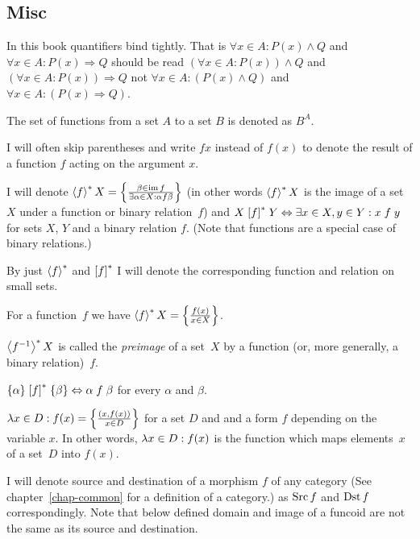 \subsection{Misc}

In this book quantifiers bind tightly. That is $\forall x\in A:P(x)\land Q$
and $\forall x\in A:P(x)\Rightarrow Q$ should be read $\left(\forall x\in A:P(x)\right)\land Q$
and $\left(\forall x\in A:P(x)\right)\Rightarrow Q$ not $\forall x\in A:\left(P(x)\land Q\right)$
and $\forall x\in A:\left(P(x)\Rightarrow Q\right)$.

The set of functions from a set $A$ to a set $B$ is denoted as $B^{A}$.

I will often skip parentheses and write $fx$ instead of $f(x)$ to
denote the result of a function $f$ acting on the argument $x$.

I will denote $\left\langle f\right\rangle ^{\ast}X=\left\{ \frac{\beta\in\operatorname{im} f}{\exists\alpha\in X:\alpha\mathrel f\beta}\right\}$
(in other words $\left\langle f\right\rangle ^{\ast}X$ is the image of a set~$X$ under a function or binary relation~$f$)
and $X\mathrel{\left[f\right]^{\ast}}Y\Leftrightarrow\exists x\in X,y\in Y:x\mathrel{f}y$
for sets $X$, $Y$ and a binary relation $f$. (Note that functions
are a special case of binary relations.)

By just $\left\langle f\right\rangle ^{\ast}$ and $\mathrel{\left[f\right]^{\ast}}$ I will denote the corresponding
function and relation on small sets.

\begin{obvious}
For a function~$f$ we have $\left\langle f\right\rangle ^{\ast}X = \left\{ \frac{f(x)}{x\in X}\right\}$.
\end{obvious}

\begin{defn}
$\left\langle f^{-1}\right\rangle ^{\ast}X$ is called the \emph{preimage} of a set~$X$ by a function (or, more generally, a binary relation)~$f$.
\end{defn}

\begin{obvious}
$\{\alpha\}\mathrel{\left[f\right]^{\ast}}\{\beta\}\Leftrightarrow\alpha\mathrel f\beta$
for every $\alpha$ and $\beta$.
\end{obvious}
$\lambda x\in D:f(x)=\left\{ \frac{(x,f(x))}{x\in D}\right\}$ for a set $D$ and
and a form $f$ depending on the variable $x$.
In other words, $\lambda x\in D:f(x)$ is the function which maps elements~$x$ of a set~$D$ into $f(x)$.

I will denote source and destination of a morphism $f$ of any category
(See chapter~\ref{chap-common} for a definition of a category.)
as $\operatorname{Src} f$ and $\operatorname{Dst} f$ correspondingly. Note that below defined
domain and image of a funcoid are not the same as its source and destination.

